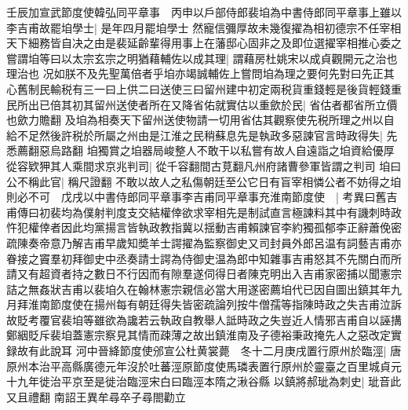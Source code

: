 壬辰加宣武節度使韓弘同平章事　丙申以戶部侍郎裴垍為中書侍郎同平章事上雖以李吉甫故罷垍學士|{
	是年四月罷垍學士}
然寵信彌厚故未幾復擢為相初德宗不任宰相天下細務皆自决之由是裴延齡輩得用事上在藩邸心固非之及即位選擢宰相推心委之嘗謂垍等曰以太宗玄宗之明猶藉輔佐以成其理|{
	謂藉房杜姚宋以成貞觀開元之治也理治也}
况如朕不及先聖萬倍者乎垍亦竭誠輔佐上嘗問垍為理之要何先對曰先正其心舊制民輸税有三一曰上供二曰送使三曰留州建中初定兩税貨重錢輕是後貨輕錢重民所出已倍其初其留州送使者所在又降省佑就實估以重歛於民|{
	省估者都省所立價也歛力贍翻}
及垍為相奏天下留州送使物請一切用省估其觀察使先税所理之州以自給不足然後許税於所屬之州由是江淮之民稍蘇息先是執政多惡諫官言時政得失|{
	先悉薦翻惡烏路翻}
垍獨賞之垍器局峻整人不敢干以私嘗有故人自遠詣之垍資給優厚從容欵狎其人乘間求京兆判司|{
	從千容翻間古莧翻凡州府諸曹參軍皆謂之判司}
垍曰公不稱此官|{
	稱尺證翻}
不敢以故人之私傷朝廷至公它日有盲宰相憐公者不妨得之垍則必不可　戊戌以中書侍郎同平章事李吉甫同平章事充淮南節度使　|{
	考異曰舊吉甫傳曰初裴均為僕射判度支交結權倖欲求宰相先是制試直言極諫料其中有譏刺時政忤犯權倖者因此均黨揚言皆執政教指冀以揺動吉甫賴諫官李約獨孤郁李正辭蕭俛密疏陳奏帝意乃解吉甫早歲知奬羊士諤擢為監察御史又司封員外郎呂温有詞藝吉甫亦眷接之竇羣初拜御史中丞奏請士諤為侍御史温為郎中知雜事吉甫怒其不先關白而所請又有超資者持之數日不行因而有隙羣遂伺得日者陳克明出入吉甫家密捕以聞憲宗詰之無姦狀吉甫以裴垍久在翰林憲宗親信必當大用遂密薦垍代已因自圖出鎮其年九月拜淮南節度使在揚州每有朝廷得失皆密疏論列按牛僧孺等指陳時政之失吉甫泣訴故貶考覆官裴垍等雖欲為讒若云執政自教舉人詆時政之失豈近人情邪吉甫自以誣搆鄭絪貶斥裴垍蓋憲宗察見其情而疎薄之故出鎮淮南及子德裕秉政掩先人之惡改定實録故有此說耳}
河中晉絳節度使邠宣公杜黄裳薨　冬十二月庚戌置行原州於臨涇|{
	唐原州本治平高縣廣德元年沒於吐蕃涇原節度使馬璘表置行原州於靈臺之百里城貞元十九年徙治平京至是徙治臨涇宋白曰臨涇本隋之湫谷縣}
以鎮將郝玼為刺史|{
	玼音此又且禮翻}
南詔王異牟尋卒子尋閤勸立


